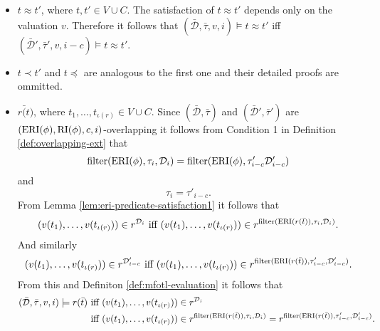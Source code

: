 \begin{itemize}
    \item 
        $t \approx t'$, where $t, t' \in V \cup C$. 
        The satisfaction of $t \approx t'$ depends only on the valuation $v$.
        Therefore it follows that $(\bar{\mathcal{D}},\bar{\tau},v,i) \models t \approx t'$ iff $(\bar{\mathcal{D}}',\bar{\tau}',v,i-c) \models t \approx t'$.
    \item 
        $t \prec t'$ and $t \preceq$ are analogous to the first one and their detailed proofs are ommitted.
    \item 
        $r{\bar(t)}$, where $t_1, \dots, t_{\iota(r)} \in V \cup C$. 
        Since $(\bar{\mathcal{D}},\bar{\tau})$ and $(\bar{\mathcal{D}}',\bar{\tau}')$ are $(\operatorname{ERI}(\phi), \operatorname{RI}(\phi), c, i)$-overlapping it follows from Condition 1 in Definition \ref{def:overlapping-ext} that 
        \begin{equation*}
            \operatorname{filter}(\operatorname{ERI}(\phi), \tau_i, \mathcal{D}_i) = \operatorname{filter}(\operatorname{ERI}(\phi), \tau'_{i-c} \mathcal{D}'_{i-c})
        \end{equation*}
        and
        \begin{equation*}
            \tau_i = \tau'_{i-c}.
        \end{equation*}
        From Lemma \ref{lem:eri-predicate-satisfaction1} it follows that 
        \begin{equation*}
            (v(t_1), \dots, v(t_{\iota(r)})) \in r^{\mathcal{D}_i}
            \text{ iff }
            (v(t_1), \dots, v(t_{\iota(r)})) \in r^{\operatorname{filter}(\operatorname{ERI}(r(\bar{t})), \tau_i, \mathcal{D}_i)}.
        \end{equation*}
        And similarly
        \begin{equation*}
            (v(t_1), \dots, v(t_{\iota(r)})) \in r^{\mathcal{D}'_{i-c}}
            \text{ iff }
            (v(t_1), \dots, v(t_{\iota(r)})) \in r^{\operatorname{filter}(\operatorname{ERI}(r(\bar{t})), \tau'_{i-c}, \mathcal{D}'_{i-c})}.
        \end{equation*}
        From this and Definiton \ref{def:mfotl-evaluation} it follows that 
        \begin{align*}
            (\bar{\mathcal{D}}, \bar{\tau}, v, i) \models r(\bar{t})
            &\text{ iff } 
            (v(t_1), \dots, v(t_{\iota(r)})) \in r^{\mathcal{D}_i} \\
            &\text{ iff }
            (v(t_1), \dots, v(t_{\iota(r)})) \in r^{\filter(\ERI(r(\bar{t})), \tau_i, \mathcal{D}_i)} = r^{\filter(\ERI(r(\bar{t})), \tau'_{i-c}, \mathcal{D}'_{i-c})}.

\end{align*}
\end{itemize}
